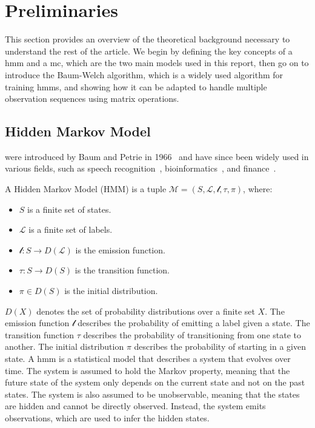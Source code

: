 \section{Preliminaries}\label{sec:preliminaries}
This section provides an overview of the theoretical background necessary to understand the rest of the article.
We begin by defining the key concepts of a \gls{hmm} and a \gls{mc}, which are the two main models used in this report, then go on to introduce the Baum-Welch algorithm, which is a widely used algorithm for training \glspl{hmm}, and showing how it can be adapted to handle multiple observation sequences using matrix operations.

\subsection{Hidden Markov Model}\label{subsec:hmm}
 were introduced by Baum and Petrie in 1966~\cite{baum1966statistical} and have since been widely used in various fields, such as speech recognition~\cite{chavan2013overview}, bioinformatics~\cite{ciocchetta2009bio}, and finance~\cite{mamon2007hidden}.
\begin{definition}
    A Hidden Markov Model (HMM) is a tuple $\mathcal{M} = (S, \mathcal{L}, \mathscr{l}, \tau,  \pi)$, where:
    \begin{itemize}
        \item $S$ is a finite set of states.
        \item $\mathcal{L}$ is a finite set of labels.
        \item $\mathscr{l}: S \rightarrow D(\mathcal{L})$ is the emission function.
        \item $\tau: S \rightarrow D(S)$ is the transition function.
        \item $\pi \in D(S)$ is the initial distribution.
    \end{itemize}
\end{definition}

$D(X)$ denotes the set of probability distributions over a  finite set $X$.
The emission function $\mathscr{l}$ describes the probability of emitting a label given a state.
The transition function $\tau$ describes the probability of transitioning from one state to another.
The initial distribution $\pi$ describes the probability of starting in a given state.
A \gls{hmm} is a statistical model that describes a system that evolves over time.
The system is assumed to hold the Markov property, meaning that the future state of the system only depends on the current state and not on the past states.
The system is also assumed to be unobservable, meaning that the states are hidden and cannot be directly observed.
Instead, the system emits observations, which are used to infer the hidden states.


